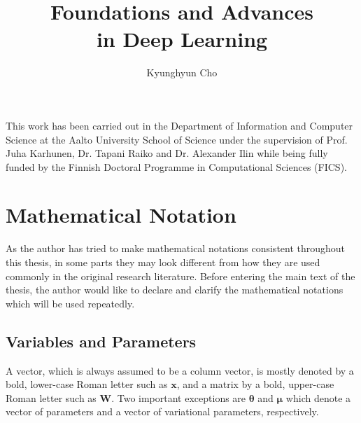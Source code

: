 \documentclass[dissertation,nocontribution]{aaltoseries}
\author{Kyunghyun Cho}
\title{Foundations and Advances \\in Deep Learning}
\newcommand{\vect}[1]{\mathbf{#1}}
\newcommand{\vects}[1]{\boldsymbol{#1}}
\newcommand{\matr}[1]{\mathbf{#1}}
\newcommand{\vx}[0]{\vect{x}}
\newcommand{\mW}[0]{\matr{W}}
\newcommand{\vmu}[0]{\vects{\mu}}
\newcommand{\TT}[0]{{\vects{\theta}}}
\begin{document}
\draftabstract{}

\begin{preface}[Espoo]
    This work has been carried out in the Department of
    Information and Computer Science at the Aalto University
    School of Science under the supervision of Prof. Juha
    Karhunen, Dr.  Tapani Raiko and Dr. Alexander Ilin while
    being fully funded by the Finnish Doctoral Programme in
    Computational Sciences (FICS). 

\end{preface}



\tableofcontents

\listofpublications



\renewcommand{\nomname}{List of Abbreviations}
%
\setlength{\nomitemsep}{-\parsep}
\printnomenclature[5em]


\chapter*{Mathematical Notation}
%

As the author has tried to make mathematical notations
consistent throughout this thesis, in some parts they may
look different from how they are used commonly in the
original research literature. Before entering the main text
of the thesis, the author would like to declare and clarify
the mathematical notations which will be used repeatedly.

\section*{Variables and Parameters}

A vector, which is always assumed to be a column vector, is
mostly denoted by a bold, lower-case Roman letter such as
$\vx$, and a matrix by a bold, upper-case Roman letter such
as $\mW$. Two important exceptions are $\TT$ and $\vmu$ which denote a
vector of parameters and a vector of variational parameters,
respectively.
\end{document}
